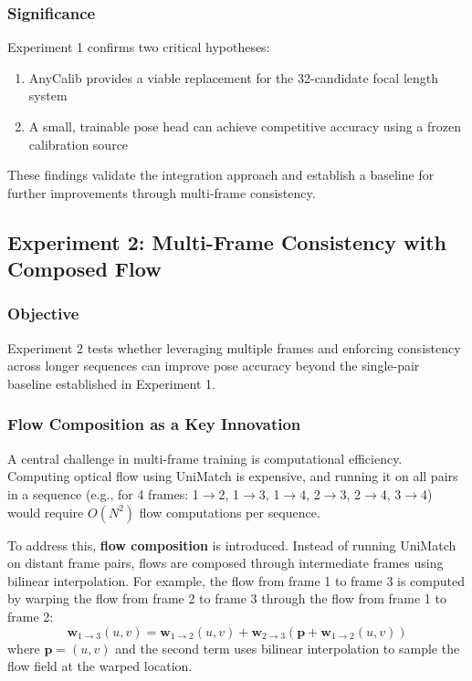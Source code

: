 \subsubsection{Significance}

Experiment 1 confirms two critical hypotheses:
\begin{enumerate}
    \item AnyCalib provides a viable replacement for the 32-candidate focal length system
    \item A small, trainable pose head can achieve competitive accuracy using a frozen calibration source
\end{enumerate}

These findings validate the integration approach and establish a baseline for further improvements through multi-frame consistency.

\subsection{Experiment 2: Multi-Frame Consistency with Composed Flow}\label{sec:experiment-2}

\subsubsection{Objective}

Experiment 2 tests whether leveraging multiple frames and enforcing consistency across longer sequences can improve pose accuracy beyond the single-pair baseline established in Experiment 1.

\subsubsection{Flow Composition as a Key Innovation}

A central challenge in multi-frame training is computational efficiency. Computing optical flow using UniMatch is expensive, and running it on all pairs in a sequence (e.g., for 4 frames: 1$\to$2, 1$\to$3, 1$\to$4, 2$\to$3, 2$\to$4, 3$\to$4) would require $O(N^2)$ flow computations per sequence.

To address this, \textbf{flow composition} is introduced. Instead of running UniMatch on distant frame pairs, flows are composed through intermediate frames using bilinear interpolation. For example, the flow from frame 1 to frame 3 is computed by warping the flow from frame 2 to frame 3 through the flow from frame 1 to frame 2:
\begin{equation}
    \mathbf{w}_{1 \to 3}(u,v) = \mathbf{w}_{1 \to 2}(u,v) + \mathbf{w}_{2 \to 3}(\mathbf{p} + \mathbf{w}_{1 \to 2}(u,v))
\end{equation}
where $\mathbf{p} = (u,v)$ and the second term uses bilinear interpolation to sample the flow field at the warped location.


